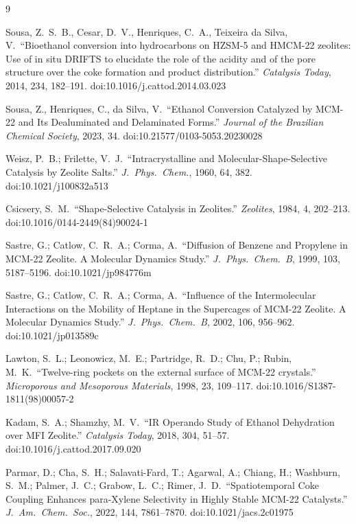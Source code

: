 \documentclass[11pt]{article}
\begin{document}
\begin{thebibliography}{9}

 Sousa, Z.\ S.\ B., Cesar, D.\ V., Henriques, C.\ A., Teixeira da Silva, V.\ ``Bioethanol conversion into hydrocarbons on HZSM-5 and HMCM-22 zeolites: Use of in situ DRIFTS to elucidate the role of the acidity and of the pore structure over the coke formation and product distribution.'' \textit{Catalysis Today}, 2014, 234, 182--191. doi:10.1016/j.cattod.2014.03.023

 Sousa, Z., Henriques, C., da Silva, V.\ ``Ethanol Conversion Catalyzed by MCM-22 and Its Dealuminated and Delaminated Forms.'' \textit{Journal of the Brazilian Chemical Society}, 2023, 34. doi:10.21577/0103-5053.20230028

 Weisz, P.\ B.; Frilette, V.\ J.\ ``Intracrystalline and Molecular-Shape-Selective Catalysis by Zeolite Salts.'' \textit{J.\ Phys.\ Chem.}, 1960, 64, 382. doi:10.1021/j100832a513

 Csicsery, S.\ M.\ ``Shape-Selective Catalysis in Zeolites.'' \textit{Zeolites}, 1984, 4, 202--213. doi:10.1016/0144-2449(84)90024-1

 Sastre, G.; Catlow, C.\ R.\ A.; Corma, A.\ ``Diffusion of Benzene and Propylene in MCM-22 Zeolite. A Molecular Dynamics Study.'' \textit{J.\ Phys.\ Chem.\ B}, 1999, 103, 5187--5196. doi:10.1021/jp984776m

 Sastre, G.; Catlow, C.\ R.\ A.; Corma, A.\ ``Influence of the Intermolecular Interactions on the Mobility of Heptane in the Supercages of MCM-22 Zeolite. A Molecular Dynamics Study.'' \textit{J.\ Phys.\ Chem.\ B}, 2002, 106, 956--962. doi:10.1021/jp013589c

 Lawton, S.\ L.; Leonowicz, M.\ E.; Partridge, R.\ D.; Chu, P.; Rubin, M.\ K.\ ``Twelve-ring pockets on the external surface of MCM-22 crystals.'' \textit{Microporous and Mesoporous Materials}, 1998, 23, 109--117. doi:10.1016/S1387-1811(98)00057-2

 Kadam, S.\ A.; Shamzhy, M.\ V.\ ``IR Operando Study of Ethanol Dehydration over MFI Zeolite.'' \textit{Catalysis Today}, 2018, 304, 51--57. doi:10.1016/j.cattod.2017.09.020

 Parmar, D.; Cha, S.\ H.; Salavati-Fard, T.; Agarwal, A.; Chiang, H.; Washburn, S.\ M.; Palmer, J.\ C.; Grabow, L.\ C.; Rimer, J.\ D.\ ``Spatiotemporal Coke Coupling Enhances para-Xylene Selectivity in Highly Stable MCM-22 Catalysts.'' \textit{J.\ Am.\ Chem.\ Soc.}, 2022, 144, 7861--7870. doi:10.1021/jacs.2c01975

\end{thebibliography}
\end{document}
